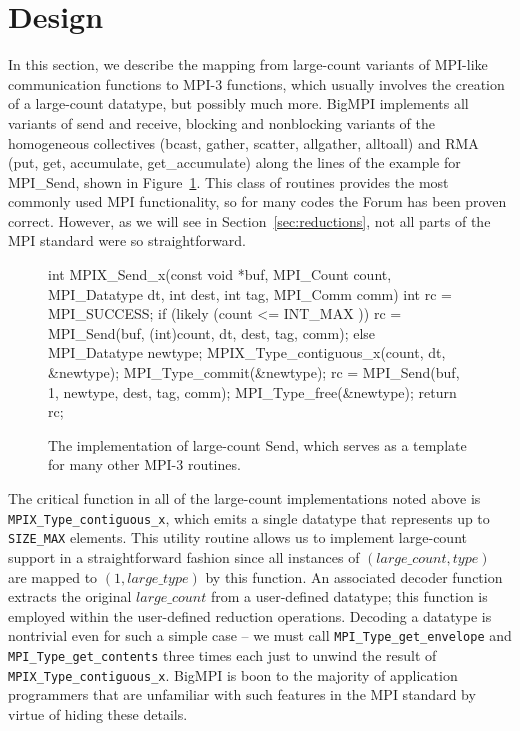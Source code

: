 
\section{Design}
\label{sec:design}

In this section, we describe the mapping from large-count variants
of MPI-like communication functions to MPI-3 functions, which usually
involves the creation of a large-count datatype, but possibly much more.
BigMPI implements all variants of send and receive, blocking and nonblocking variants of
the homogeneous collectives (bcast, gather, scatter, allgather, alltoall)
and RMA (put, get, accumulate, get\_accumulate)
along the lines of the example for MPI\_Send, shown in Figure~\ref{code:mpi_send_x}.
This class of routines provides the most commonly used MPI functionality, 
so for many codes the Forum has been proven correct.  
However, as we will see in Section~\ref{sec:reductions},
not all parts of the MPI standard were so straightforward.

\begin{figure}
\begin{code}
int MPIX_Send_x(const void *buf, MPI_Count count,
                MPI_Datatype dt, int dest,
                int tag, MPI_Comm comm)
{
    int rc = MPI_SUCCESS;
    if (likely (count <= INT_MAX )) {
        rc = MPI_Send(buf, (int)count, dt, dest, tag, comm);
    } else {
        MPI_Datatype newtype;
        MPIX_Type_contiguous_x(count, dt, &newtype);
        MPI_Type_commit(&newtype);
        rc = MPI_Send(buf, 1, newtype, dest, tag, comm);
        MPI_Type_free(&newtype);
    }
    return rc;
}
\end{code}
\caption{The implementation of large-count Send, which serves as a template
for many other MPI-3 routines.\label{code:mpi_send_x}}
\end{figure}

The critical function in all of the large-count implementations noted above
is \texttt{MPIX\_Type\_contiguous\_x}, which emits a single datatype that
represents up to \texttt{SIZE\_MAX} elements.
This utility routine allows us to implement large-count support in a straightforward
fashion since all instances of $(large\_count,type)$ are mapped to $(1,large\_type)$
by this function.
An associated decoder function extracts the original $large\_count$ from a
user-defined datatype; this function is employed within the user-defined reduction
operations.  Decoding a datatype is nontrivial even for such a simple case --
we must call \texttt{MPI\_Type\_get\_envelope} and \texttt{MPI\_Type\_get\_contents}
three times each just to unwind the result of \texttt{MPIX\_Type\_contiguous\_x}.
BigMPI is boon to the majority of application programmers that are unfamiliar 
with such features in the MPI standard by virtue of hiding these details.


